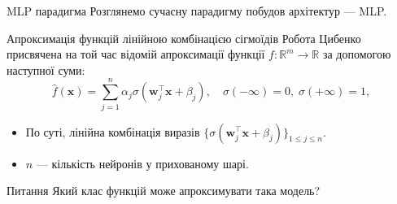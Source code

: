 \documentclass{zkdl-presentation-template}
\begin{document}
        \begin{frame}{MLP парадигма}
        Розглянемо сучасну парадигму побудов архітектур --- MLP.
        \begin{block}{Апроксимація функцій лінійною комбінацією сігмоїдів}
            Робота Цибенко \cite{cybenko} присвячена на той час відомій апроксимації функції $f:
            \mathbb{R}^m \to \mathbb{R}$ за допомогою наступної суми:
            \begin{equation*}\label{eq:cybenko-g}
                \hat{f}(\boldsymbol{x}) = \sum_{j=1}^n \alpha_j \sigma(\boldsymbol{w}_j^{\top}\boldsymbol{x} + \beta_j), \quad \sigma(-\infty) = 0,\; \sigma(+\infty) = 1,
            \end{equation*}
            \pause\begin{itemize}
                \item По суті, лінійна комбінація виразів $\{\sigma(\boldsymbol{w}_j^{\top}\boldsymbol{x} + \beta_j)\}_{1 \leq j \leq n}$.
                \item $n$ --- кількість нейронів у прихованому шарі.\pause
            \end{itemize}
        \end{block}

        \begin{alertblock}{Питання}
            Який клас функцій може апроксимувати така модель?
        \end{alertblock}
    \end{frame}
\end{document}
